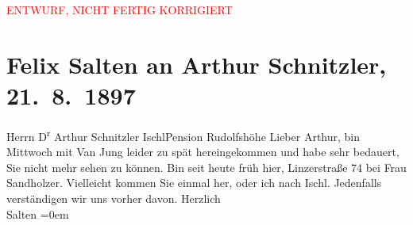 
\begin{center}
            \textcolor{red}{ENTWURF, NICHT FERTIG KORRIGIERT}
                      \end{center}
            
         
         \renewcommand{\erwaehntePersonen}{Personen: Maria Sandholzer, Leo Van-Jung}
         \renewcommand{\erwaehnteOrte}{Orte: Bad Ischl, Hotel und Pension Rudolfshöhe (Leopold Petter), Linzer Gasse, Salzburg}
         \renewcommand{\erwaehnteWerke}{}
               \section[Felix Salten an Arthur Schnitzler, 21. 8. 1897]{ Felix Salten an Arthur Schnitzler, 21. 8. 1897}\nopagebreak{}\rehead{ }\begin{ledgroupsized}[t]{13cm}\normalsize\beginnumbering \toendnotes[C]{\smallbreak\pagebreak[2]} 
\pstart{}{\pb}Herrn D\textsuperscript{r} Arthur Schnitzler \pend{}\pstart{}Ischl\pend{}\pstart{}Pension Rudolfshöhe\pend{}{\bigskip}\pstart
           \noindent{}{\pb}Lieber Arthur, bin Mittwoch mit Van Jung leider zu spät hereingekommen und habe sehr
               bedauert, Sie nicht mehr sehen zu können. Bin seit heute früh hier, Linzerstraße 74 bei Frau Sandholzer.\pend
           \pstart
           Vielleicht kommen Sie einmal her, oder ich nach Ischl. Jedenfalls verständigen wir uns vorher davon. \pend
           \pstart
           Herzlich {\\[\baselineskip]}\spacefill\mbox{Salten}\pend
           \leftskip=0em{}
         
         \endnumbering{}\end{ledgroupsized}\begin{anhang}\end{anhang}\newcommand{\dateiname}{L03272}\newcommand{\titel}{Felix Salten an Arthur Schnitzler, 21. 8. 1897}\newcommand{\editorInnen}{Martin Anton Müller und Laura Untner}
      